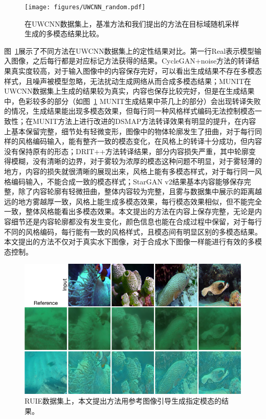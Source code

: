 \begin{figure}[htp]
    \centering
	\texttt{[image: figures/UWCNN\_random.pdf]}
	\caption{在UWCNN数据集上，基准方法和我们提出的方法在目标域随机采样生成的多模态结果比较。}
	\label{fig:uwcnn_random}
\end{figure}

图~\ref{fig:uwcnn_random}展示了不同方法在UWCNN数据集上的定性结果对比。第一行Real表示模型输入图像，之后每行都是对应标记方法获得的结果。CycleGAN+noise方法的转译结果真实度较高，对于输入图像中的内容保存完好，可以看出生成结果不存在多模态样式，且噪声被模型忽略，无法扰动生成网络从而合成多模态结果；MUNIT在UWCNN数据集上生成的结果较为真实，内容也保存比较完好，但是在生成结果中，色彩较多的部分（如图~\ref{fig:uwcnn_random} MUNIT生成结果中茶几上的部分）会出现转译失败的情况，生成结果能出现多模态效果，但每行同一种风格样式编码无法控制模态一致性；在MUNIT方法上进行改进的DSMAP方法转译效果有明显的提升，在内容上基本保留完整，细节处有轻微变形，图像中的物体轮廓发生了扭曲，对于每行同样的风格编码输入，能有整齐一致的模态变化，在风格上的转译十分成功，但内容没有保持原有的形态；DRIT++方法转译结果，部分内容损失严重，其中轮廓变得模糊，没有清晰的边界，对于雾较为浓厚的模态这种问题不明显，对于雾轻薄的地方，内容的损失就很清晰的展现出来，风格上能有多模态样式，对于每行同一风格编码输入，不能合成一致的模态样式；StarGAN v2结果基本内容能够保存完整，除了内容轮廓有轻微扭曲，整体内容较为完整，且雾与数据集中展示的距离越远的地方雾越厚一致，风格上能生成多模态效果，每行模态效果相似，但不能完全一致，整体风格能看出多模态效果。本文提出的方法在内容上保存完整，无论是内容细节还是内容轮廓都没有发生变化，颜色信息也能在合成过程中保留，对于每行不同的风格编码，每行能有一致的风格样式，且模态间有明显区别的多模态结果。本文提出的方法不仅对于真实水下图像，对于合成水下图像一样能进行有效的多模态控制。


\begin{figure}[ht]
    \centering
	\includegraphics[width=\textwidth]{figures/RUIE_guidance.pdf}
	\caption{RUIE数据集上，本文提出方法用参考图像引导生成指定模态的结果。}
	\label{fig:ruie_guide}
\end{figure}


